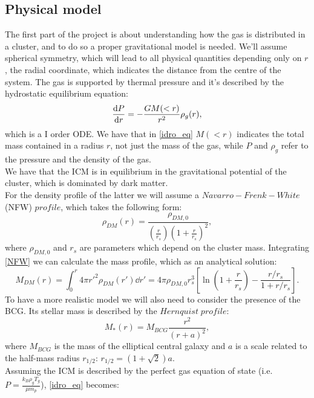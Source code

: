 \documentclass{article}
\begin{document}
\subsection{Physical model}
The first part of the project is about understanding how the gas is distributed in a cluster, and to do so a proper gravitational model is needed.
We'll assume spherical symmetry, which will lead to all physical quantities depending only on $r$, the radial coordinate, which indicates the distance from the centre of the system.
The gas is supported by thermal pressure and it's described by the hydrostatic equilibrium equation:
\begin{equation}\label{idro_eq}
	\derivative{P}{r}=-\frac{GM(<r)}{r^{2}}\rho_{g}(r),
\end{equation}
which is a I order ODE. We have that in \eqref{idro_eq} $M(<r)$ indicates the total mass contained in a radius $r$, not just the mass of the gas, while $P$ and $\rho_{g}$ refer to the pressure and the density of the gas. \\
We have that the ICM is in equilibrium in the gravitational potential of the cluster, which is dominated by dark matter. \\
For the density profile of the latter we will assume a $Navarro-Frenk-White$ (NFW) $profile$, which takes the following form:
\begin{equation}\label{NFW}
	\rho_{DM}(r)=\frac{\rho_{DM,0}}{\left(\frac{r}{r_{s}}\right)\left(1+\frac{r}{r_{s}}\right)^{2}},
\end{equation}
where $\rho_{DM,0}$ and $r_{s}$ are parameters which depend on the cluster mass. 
Integrating \eqref{NFW} we can calculate the mass profile, which as an analytical solution:
\begin{equation}\label{massDM}
	M_{DM}(r)=\int_{0}^{r}4\pi r'^{2}\rho_{DM}(r')\dd{r'}=4\pi\rho_{DM,0}r_{s}^{3}\left[\ln\left(1+\frac{r}{r_{s}}\right)-\frac{r/r_{s}}{1+r/r_{s}}\right].
\end{equation}
To have a more realistic model we will also need to consider the presence of the BCG. Its stellar mass is described by the $Hernquist\; profile$:
\begin{equation}\label{Hern}
	M_{*}(r)=M_{BCG}\frac{r^{2}}{(r+a)^{2}},
\end{equation}
where $M_{BCG}$ is the mass of the elliptical central galaxy and $a$ is a scale related to the half-mass radius $r_{1/2}$: $r_{1/2}=(1+\sqrt{2})a$.\\
Assuming the ICM is described by the perfect gas equation of state (i.e. $P=\frac{k_{B}\rho_{g}T_{g}}{\mu m_{p}}$), \eqref{idro_eq} becomes:
\end{document}
